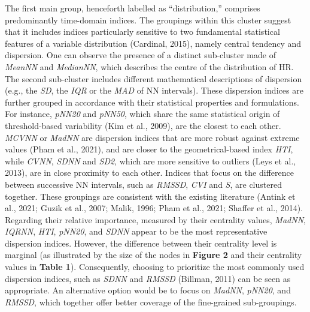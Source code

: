 \documentclass[
  english,
  jou,floatsintext]{apa6}
\begin{document}
The first main group, henceforth labelled as ``distribution,'' comprises predominantly time-domain indices. The groupings within this cluster suggest that it includes indices particularly sensitive to two fundamental statistical features of a variable distribution (Cardinal, 2015), namely central tendency and dispersion. One can observe the presence of a distinct sub-cluster made of \emph{MeanNN} and \emph{MedianNN}, which describes the centre of the distribution of HR. The second sub-cluster includes different mathematical descriptions of dispersion (e.g., the \emph{SD}, the \emph{IQR} or the \emph{MAD} of NN intervals). These dispersion indices are further grouped in accordance with their statistical properties and formulations. For instance, \emph{pNN20} and \emph{pNN50}, which share the same statistical origin of threshold-based variability (Kim et al., 2009), are the closest to each other. \emph{MCVNN} or \emph{MadNN} are dispersion indices that are more robust against extreme values (Pham et al., 2021), and are closer to the geometrical-based index \emph{HTI}, while \emph{CVNN}, \emph{SDNN} and \emph{SD2}, which are more sensitive to outliers (Leys et al., 2013), are in close proximity to each other. Indices that focus on the difference between successive NN intervals, such as \emph{RMSSD}, \emph{CVI} and \emph{S}, are clustered together. These groupings are consistent with the existing literature (Antink et al., 2021; Guzik et al., 2007; Malik, 1996; Pham et al., 2021; Shaffer et al., 2014). Regarding their relative importance, measured by their centrality values, \emph{MadNN}, \emph{IQRNN}, \emph{HTI}, \emph{pNN20}, and \emph{SDNN} appear to be the most representative dispersion indices. However, the difference between their centrality level is marginal (as illustrated by the size of the nodes in \textbf{Figure 2} and their centrality values in \textbf{Table 1}). Consequently, choosing to prioritize the most commonly used dispersion indices, such as \emph{SDNN} and \emph{RMSSD} (Billman, 2011) can be seen as appropriate. An alternative option would be to focus on \emph{MadNN}, \emph{pNN20}, and \emph{RMSSD}, which together offer better coverage of the fine-grained sub-groupings.
\end{document}

